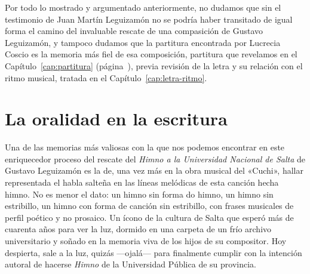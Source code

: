 Por todo lo mostrado y argumentado anteriormente, no dudamos que sin el testimonio de Juan Martín Leguizamón no se podría haber transitado de igual forma el camino del invaluable rescate de una compasición de Gustavo Leguizamón, y tampoco dudamos que la partitura encontrada por Lucrecia Coscio es la memoria más fiel de esa composición, partitura que revelamos en el Capítulo~\ref{cap:partitura} (página~\pageref{cap:partitura}), previa revisión de la letra y su relación con el ritmo musical, tratada en el Capítulo~\ref{cap:letra-ritmo}.

\section{La oralidad en la escritura}
\label{sec:oralidad-escritura}

Una de las memorias más valiosas con la que nos podemos encontrar en este enriquecedor proceso del rescate del \emph{Himno a la Universidad Nacional de Salta} de Gustavo Leguizamón es la de, una vez más en la obra musical del «Cuchi», hallar representada el habla salteña en las líneas melódicas de esta canción hecha himno. No es menor el dato: un himno sin forma do himno, un himno sin estribillo, un himno con forma de canción sin estribillo, con frases musicales de perfil poético y no prosaico. Un ícono de la cultura de Salta que esperó más de cuarenta años para ver la luz, dormido en una carpeta de un frío archivo universitario y soñado en la memoria viva de los hijos de su compositor. Hoy despierta, sale a la luz, quizás ---ojalá--- para finalmente cumplir con la intención autoral de hacerse \emph{Himno} de la Universidad Pública de su provincia.
